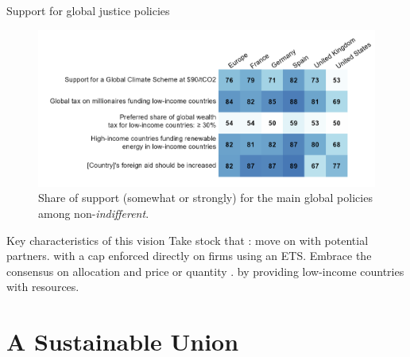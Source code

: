 \documentclass[aspectratio=169,xcolor=dvipsnames, 11pt,mathserif]{beamer}
\begin{document}
\begin{frame}{Support for global justice policies\label{support}\hyperlink{support_more}{}}
	\vspace{-.3cm}
	\begin{figure}[h!]
		\centering		
		\caption{Share of support (somewhat or strongly) for the main global policies among non-\textit{indifferent}.  
        }
        \vspace{-.2cm}
		\includegraphics[width=\textwidth]{../figures/country_comparison/few_main_share.png} %
		\end{figure} 
\end{frame}


\begin{frame}{Key characteristics of this vision}
    \bbsp \ip Take stock that : move on with potential partners.
    \ip {} with a cap enforced directly on firms using an ETS.
    \ip Embrace the consensus on  allocation and  price or quantity .
    \ip {} by providing low-income countries with resources.%
    \ee
\end{frame}
    

\section{A Sustainable Union}
\end{document}
